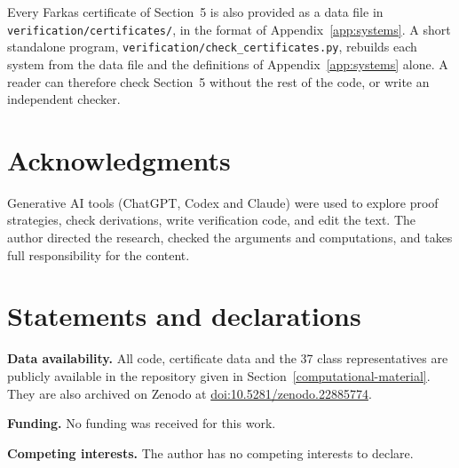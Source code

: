 \documentclass[11pt]{article}
\begin{document}
Every Farkas certificate of Section~5 is also provided as a data file in \texttt{verification/certificates/}, in the format of Appendix~\ref{app:systems}. A short standalone program, \texttt{verification/check\_certificates.py}, rebuilds each system from the data file and the definitions of Appendix~\ref{app:systems} alone. A reader can therefore check Section~5 without the rest of the code, or write an independent checker.

\section*{Acknowledgments}

Generative AI tools (ChatGPT, Codex and Claude) were used to explore proof strategies, check derivations, write verification code, and edit the text. The author directed the research, checked the arguments and computations, and takes full responsibility for the content.

\section*{Statements and declarations}

\textbf{Data availability.} All code, certificate data and the 37 class representatives are publicly available in the repository given in Section~\ref{computational-material}. They are also archived on Zenodo at \href{https://doi.org/10.5281/zenodo.22885774}{doi:10.5281/zenodo.22885774}.

\textbf{Funding.} No funding was received for this work.

\textbf{Competing interests.} The author has no competing interests to declare.
\end{document}
